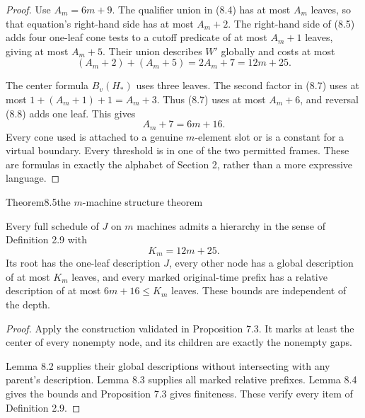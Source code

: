 \begin{proof}
Use \(A_m=6m+9\). The qualifier union in (8.4) has at most \(A_m\) leaves, so that equation's right-hand side has at most \(A_m+2\). The right-hand side of (8.5) adds four one-leaf cone tests to a cutoff predicate of at most \(A_m+1\) leaves, giving at most \(A_m+5\). Their union describes \(W'\) globally and costs at most \[
(A_m+2)+(A_m+5)=2A_m+7=12m+25.
\tag{8.9}
\]

The center formula \(B_v(H_*)\) uses three leaves. The second factor in (8.7) uses at most \(1+(A_m+1)+1=A_m+3\). Thus (8.7) uses at most \(A_m+6\), and reversal (8.8) adds one leaf. This gives \[
A_m+7=6m+16.
\tag{8.10}
\] Every cone used is attached to a genuine \(m\)-element slot or is a constant for a virtual boundary. Every threshold is in one of the two permitted frames. These are formulas in exactly the alphabet of Section 2, rather than a more expressive language.
\end{proof}

\begin{numbered}{Theorem}{8.5}{the \(m\)-machine structure theorem}

Every full schedule of \(J\) on \(m\) machines admits a hierarchy in the sense of Definition 2.9 with \[
K_m=12m+25.
\tag{8.11}
\] Its root has the one-leaf description \(J\), every other node has a global description of at most \(K_m\) leaves, and every marked original-time prefix has a relative description of at most \(6m+16\leq K_m\) leaves. These bounds are independent of the depth.

\end{numbered}

\begin{proof}
Apply the construction validated in Proposition 7.3. It marks at least the center of every nonempty node, and its children are exactly the nonempty gaps.

Lemma 8.2 supplies their global descriptions without intersecting with any parent's description. Lemma 8.3 supplies all marked relative prefixes. Lemma 8.4 gives the bounds and Proposition 7.3 gives finiteness. These verify every item of Definition 2.9.
\end{proof}


